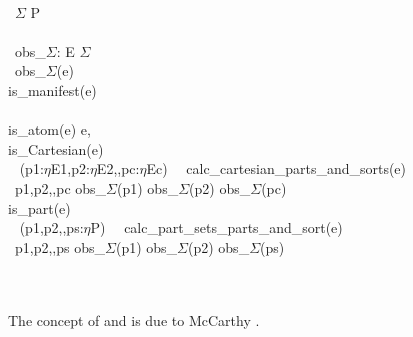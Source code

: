 \bp
{}\\
\>\ $\Sigma$ {\EQ} P\\
\\
\>\ obs\_$\Sigma$: E {\RIGHTARROW} $\Sigma$\\
\>\ obs\_$\Sigma$(e) {\IS}\\
\>\>\> is\_manifest(e) \\
\>\>\>\>\ \\
\>\>\>\>\>\>is\_atom(e) {\RIGHTARROW} {\LBRACE}e{\RBRACE},\\
\>\>\>\>\>\>is\_Cartesian(e) {\RIGHTARROW}\\
\>\>\>\>\>\>\>\  (p1:$\eta$E1,p2:$\eta$E2,{\DOTDOTDOT},pc:$\eta$Ec) {\EQ}\ \ calc\_cartesian\_parts\_and\_sorts(e) \\
\>\>\>\>\>\>\>\ {\LBRACE}p1,p2,{\DOTDOTDOT},pc{\RBRACE} {\UNION} obs\_$\Sigma$(p1) {\UNION} obs\_$\Sigma$(p2) {\UNION} {\DOTDOTDOT} {\UNION} obs\_$\Sigma$(pc) \\
\>\>\>\>\>\>is\_part(e) {\RIGHTARROW} \\
\>\>\>\>\>\>\>\  ({\LBRACE}p1,p2,{\DOTDOTDOT},ps{\RBRACE}:$\eta$P) {\EQ}\ \ calc\_part\_sets\_parts\_and\_sort(e) \\
\>\>\>\>\>\>\>\ {\LBRACE}p1,p2,{\DOTDOTDOT},ps{\RBRACE} {\UNION} obs\_$\Sigma$(p1) {\UNION} obs\_$\Sigma$(p2) {\UNION} {\DOTDOTDOT} {\UNION} obs\_$\Sigma$(ps) \\
\>\>\>\>\  {\LBRACE}{\RBRACE}\\
\>\>\>\ \ \ \ \ 
\ep
\eff


\label{AProofTheoreticExplicationI}

\begynd
\pind The concept of  and  is due to McCarthy \cite[]{Mc62a}.


